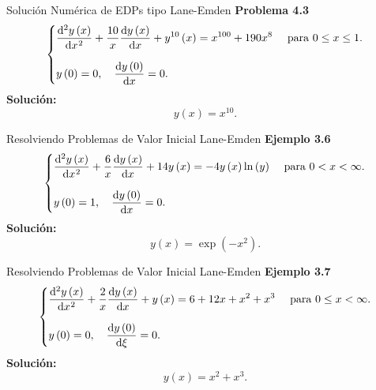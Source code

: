 \documentclass[
    8pt,
    aspectratio=1610,
    c,
    spanish,
    handout,
    intlimits,
    leqno,
    professionalfonts,
    spanish,
    xcolor=svgnames,
]{beamer}
\begin{document}
\begin{frame}{Solución Numérica de EDPs tipo Lane-Emden}
	\textbf{Problema 4.3}
	\begin{equation}
		\begin{cases}\displaystyle
			\diff[2]{y\left(x\right)}{x}+
			\frac{10}{x}
			\diff{y\left(x\right)}{x} +
			y^{10}\left(x\right) =
			x^{100} + 190x^{8}
			 & \text { para }0 \leq x \leq 1. \\[0.5cm]
			\displaystyle
			y
			\left(0\right)=
			0,\quad
			\diff{y\left(0\right)}{x}=
			0.
			 &
		\end{cases}
	\end{equation}
	\textbf{Solución:}
	\begin{equation*}
		\boxed{y\left(x\right)=x^{10}.}
	\end{equation*}
\end{frame}

\begin{frame}{Resolviendo Problemas de Valor Inicial Lane-Emden}
	\textbf{Ejemplo 3.6}
	\begin{equation}
		\begin{cases}\displaystyle
			\diff[2]{y\left(x\right)}{x}+
			\frac{6}{x}
			\diff{y\left(x\right)}{x}+
			14y\left(x\right)=
			-4y\left(x\right)
			\ln\left(y\right)
			 & \text { para }0<x<\infty. \\[0.5cm]
			\displaystyle
			y
			\left(0\right)=
			1,\quad
			\diff{y\left(0\right)}{x}=
			0.
			 &
		\end{cases}
	\end{equation}
	\textbf{Solución:}
	\begin{equation*}
		\boxed{y\left(x\right)=\exp\left(-x^{2}\right).}
	\end{equation*}
\end{frame}

\begin{frame}{Resolviendo Problemas de Valor Inicial Lane-Emden}
	\textbf{Ejemplo 3.7}
	\begin{equation}
		\begin{cases}\displaystyle
			\diff[2]{y\left(x\right)}{x}+
			\frac{2}{x}
			\diff{y\left(x\right)}{x}+
			y\left(x\right)=
			6+12x+x^{2}+x^{3}
			 & \text { para }0\leq x<\infty. \\[0.5cm]
			\displaystyle
			y
			\left(0\right)=
			0,\quad
			\diff{y\left(0\right)}{\xi}=
			0.
			 &
		\end{cases}
	\end{equation}
	\textbf{Solución:}
	\begin{equation*}
		\boxed{y\left(x\right)=x^{2}+x^{3}.}
	\end{equation*}
\end{frame}
\end{document}
